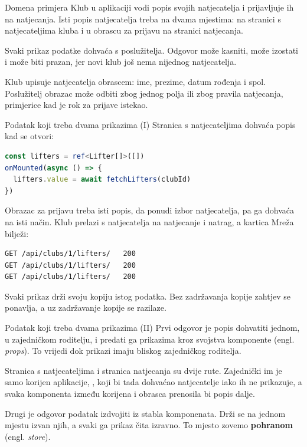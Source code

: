 \begin{frame}{Domena primjera}
Klub u aplikaciji vodi popis svojih natjecatelja i prijavljuje ih na natjecanja. Isti popis natjecatelja treba na dvama mjestima: na stranici s natjecateljima kluba i u obrascu za prijavu na stranici natjecanja.

\vspace{0.9em}
Svaki prikaz podatke dohvaća s poslužitelja. Odgovor može kasniti, može izostati i može biti prazan, jer novi klub još nema nijednog natjecatelja.

\vspace{0.9em}
Klub upisuje natjecatelja obrascem: ime, prezime, datum rođenja i spol. Poslužitelj obrazac može odbiti zbog jednog polja ili zbog pravila natjecanja, primjerice kad je rok za prijave istekao.
\end{frame}

\begin{frame}[fragile]{Podatak koji treba dvama prikazima (I)}
Stranica s natjecateljima dohvaća popis kad se otvori:

\begin{lstlisting}[language=typescript]
const lifters = ref<Lifter[]>([])
onMounted(async () => {
  lifters.value = await fetchLifters(clubId)
})
\end{lstlisting}

\vspace{0.3em}
Obrazac za prijavu treba isti popis, da ponudi izbor natjecatelja, pa ga dohvaća na isti način. Klub prelazi s natjecatelja na natjecanje i natrag, a kartica Mreža bilježi:

\begin{lstlisting}
GET /api/clubs/1/lifters/   200
GET /api/clubs/1/lifters/   200
GET /api/clubs/1/lifters/   200
\end{lstlisting}

\vspace{0.3em}
Svaki prikaz drži svoju kopiju istog podatka. Bez zadržavanja kopije zahtjev se ponavlja, a uz zadržavanje kopije se razilaze.
\end{frame}

\begin{frame}{Podatak koji treba dvama prikazima (II)}
Prvi odgovor je popis dohvatiti jednom, u zajedničkom roditelju, i predati ga prikazima kroz svojstva komponente (engl. \emph{props}). To vrijedi dok prikazi imaju bliskog zajedničkog roditelja.

\vspace{0.9em}
Stranica s natjecateljima i stranica natjecanja su dvije rute. Zajednički im je samo korijen aplikacije, , koji bi tada dohvaćao natjecatelje iako ih ne prikazuje, a svaka komponenta između korijena i obrasca prenosila bi popis dalje.

\vspace{0.9em}
Drugi je odgovor podatak izdvojiti iz stabla komponenata. Drži se na jednom mjestu izvan njih, a svaki ga prikaz čita izravno. To mjesto zovemo \textbf{pohranom} (engl. \emph{store}).
\end{frame}

